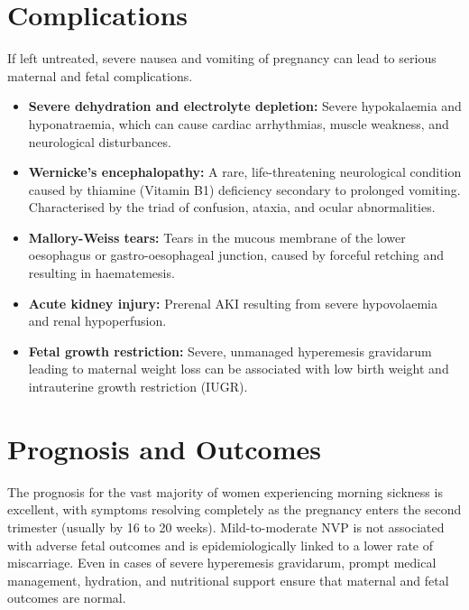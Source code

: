 \section*{Complications}
If left untreated, severe nausea and vomiting of pregnancy can lead to serious maternal and fetal complications.
\begin{itemize}
    \item \textbf{Severe dehydration and electrolyte depletion:} Severe hypokalaemia and hyponatraemia, which can cause cardiac arrhythmias, muscle weakness, and neurological disturbances.
    \item \textbf{Wernicke's encephalopathy:} A rare, life-threatening neurological condition caused by thiamine (Vitamin B1) deficiency secondary to prolonged vomiting. Characterised by the triad of confusion, ataxia, and ocular abnormalities.
    \item \textbf{Mallory-Weiss tears:} Tears in the mucous membrane of the lower oesophagus or gastro-oesophageal junction, caused by forceful retching and resulting in haematemesis.
    \item \textbf{Acute kidney injury:} Prerenal AKI resulting from severe hypovolaemia and renal hypoperfusion.
    \item \textbf{Fetal growth restriction:} Severe, unmanaged hyperemesis gravidarum leading to maternal weight loss can be associated with low birth weight and intrauterine growth restriction (IUGR).
\end{itemize}

\section*{Prognosis and Outcomes}
The prognosis for the vast majority of women experiencing morning sickness is excellent, with symptoms resolving completely as the pregnancy enters the second trimester (usually by 16 to 20 weeks). Mild-to-moderate NVP is not associated with adverse fetal outcomes and is epidemiologically linked to a lower rate of miscarriage. Even in cases of severe hyperemesis gravidarum, prompt medical management, hydration, and nutritional support ensure that maternal and fetal outcomes are normal.


